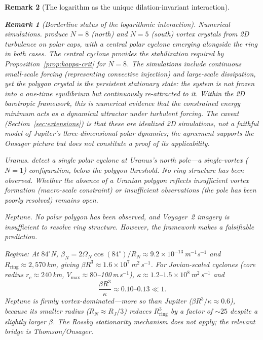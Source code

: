 \documentclass[12pt, a4paper]{article}
\newtheorem{remark}{Remark}[section]
\numberwithin{equation}{section}
\begin{document}
\begin{remark}[The logarithm as the unique dilation-invariant interaction]
\begin{remark}[Borderline status of the logarithmic interaction]
\emph{Numerical simulations.}  \citet{Siegelman2022} produce $N = 8$
(north) and $N = 5$ (south) vortex crystals from 2D turbulence on polar
caps, with a central polar cyclone emerging alongside the ring in both
cases.  The central cyclone provides the stabilization required by
Proposition~\ref{prop:kappa-crit} for $N = 8$.
The \citet{Siegelman2022} simulations include continuous small-scale
forcing (representing convective injection) and large-scale dissipation,
yet the polygon crystal is the persistent stationary state: the system
is not frozen into a one-time equilibrium but continuously re-attracted
to it.  Within the 2D barotropic framework, this is numerical evidence
that the constrained energy minimum acts as a \emph{dynamical attractor}
under turbulent forcing.  The caveat (Section~\ref{sec:extensions}) is
that these are idealized 2D simulations, not a faithful model of
Jupiter's three-dimensional polar dynamics; the agreement supports the
Onsager picture but does not constitute a proof of its applicability.

\emph{Uranus.}  \citet{Akins2023} detect a single polar cyclone at
Uranus's north pole---a single-vortex ($N = 1$) configuration, below
the polygon threshold.  No ring structure has been observed.  Whether
the absence of a Uranian polygon reflects insufficient vortex formation
(macro-scale constraint) or insufficient observations (the pole has been
poorly resolved) remains open.

\emph{Neptune.}  No polar polygon has been observed, and Voyager~2
imagery is insufficient to resolve ring structure.  However, the
framework makes a falsifiable prediction.

\textit{Regime:}
At $84^\circ$N, $\beta_N = 2\Omega_N\cos(84^\circ)/R_N \approx
9.2\times10^{-13}$\,m$^{-1}$s$^{-1}$ and $R_{\mathrm{ring}} \approx
2{,}570$\,km, giving $\beta R^3 \approx 1.6\times10^7$\,m$^2$\,s$^{-1}$.
For Jovian-scaled cyclones (core radius $r_c \approx 240$\,km,
$V_{\max}\approx 80$--100\,m\,s$^{-1}$), $\kappa \approx
1.2\text{--}1.5\times10^8$\,m$^2$\,s$^{-1}$ and
\[
  \frac{\beta R^3}{\kappa}\approx 0.10\text{--}0.13 \ll 1.
\]
Neptune is firmly vortex-dominated---more so than Jupiter ($\beta
R^3/\kappa \approx 0.6$), because its smaller radius ($R_N \approx
R_J/3$) reduces $R_{\mathrm{ring}}^3$ by a factor of $\sim\!25$
despite a slightly larger $\beta$.  The Rossby stationarity mechanism
does not apply; the relevant bridge is Thomson/Onsager.


\end{remark}
\end{remark}
\end{document}
